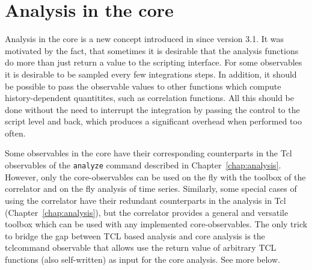 %  
%   
%  
%  
%
\newcommand{\taumax}{\tau_{\mathrm{max}}}
\newcommand{\taumin}{\tau_{\mathrm{min}}}

\chapter{Analysis in the core}
\label{chap:analysis-core}

Analysis in the core is a new concept introduced in \es since version
3.1.  It was motivated by the fact, that sometimes it is desirable
that the analysis functions do more than just return a value to the
scripting interface.  For some observables it is desirable to be
sampled every few integrations steps. In addition, it should be
possible to pass the observable values to other functions which
compute history-dependent quantitites, such as correlation functions.
All this should be done without the need to interrupt the integration
by passing the control to the script level and back, which produces a
significant overhead when performed too often.

Some observables in the core have their corresponding counterparts in
the Tcl observables of the \verb!analyze! command described in
Chapter~\ref{chap:analysis}.  However, only the core-observables can
be used on the fly with the toolbox of the correlator and on the fly
analysis of time series.  Similarly, some special cases of using the
correlator have their redundant counterparts in the analysis in Tcl
(Chapter~\ref{chap:analysis}), but the correlator provides a general
and versatile toolbox which can be used with any implemented
core-observables. The only trick to bridge the gap between TCL based 
analysis and core analysis is the tclcommand observable that allows
use the return value of arbitrary TCL functions (also self-written) 
as input for the core analysis. See more below.

